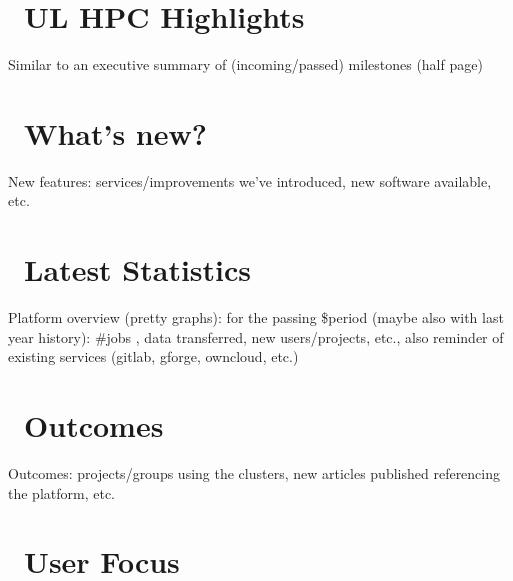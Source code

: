 \documentclass{article}
\begin{document}
\ulhpctoc

\begin{welcome}
  \lipsum[1]
\end{welcome}

\section{\faCommentAlt\ UL HPC Highlights}

Similar to an executive summary of (incoming/passed)
milestones (half page)

\section{\faBullhorn\ What's new?}

New features: services/improvements we've introduced, new software
available, etc.

\section{\faBarChart\ Latest Statistics}

Platform overview (pretty graphs): for the passing \$period (maybe also
with last year history): \#jobs , data transferred,  new users/projects,
etc., also reminder of existing services (gitlab, gforge, owncloud, etc.)

\section{\faShare\ Outcomes}

Outcomes: projects/groups using the clusters, new articles published
referencing the platform, etc.

\section{\faUser\ User Focus}
\end{document}
